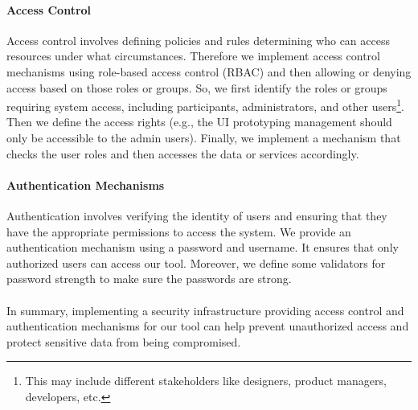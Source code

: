 \paragraph{Access Control}
Access control involves defining policies and rules determining who can access resources under what circumstances.
Therefore we implement access control mechanisms using role-based access control (RBAC) and then allowing or denying access based on those roles or groups.
So, we first identify the roles or groups requiring system access, including participants, administrators, and other users\footnote{This may include different stakeholders like designers, product managers, developers, etc.}. 
Then we define the access rights (e.g., the UI prototyping management should only be accessible to the admin users).
Finally, we implement a mechanism that checks the user roles and then accesses the data or services accordingly. 

\paragraph{Authentication Mechanisms}
Authentication involves verifying the identity of users and ensuring that they have the appropriate permissions to access the system.
We provide an authentication mechanism using a password and username. 
It ensures that only authorized users can access our tool.
Moreover, we define some validators for password strength to make sure the passwords are strong.\\\\
In summary, implementing a security infrastructure providing access control and authentication mechanisms for our tool can help prevent unauthorized access and protect sensitive data from being compromised.

\clearpage